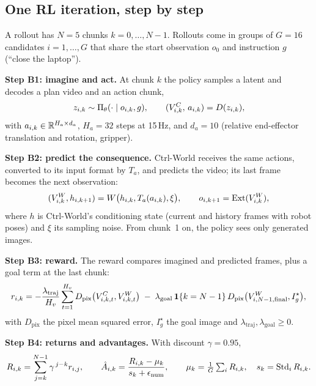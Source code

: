 \subsection{One RL iteration, step by step}
A rollout has $N=5$ chunks $k=0,\dots,N-1$. Rollouts come in groups of $G=16$ candidates $i=1,\dots,G$ that share the start observation $o_0$ and instruction $g$ (``close the laptop'').

\textbf{Step B1: imagine and act.} At chunk $k$ the policy samples a latent and decodes a plan video and an action chunk,
\begin{equation}
z_{i,k}\sim\Pi_\theta(\cdot\mid o_{i,k},g),\qquad (V^{C}_{i,k},\,a_{i,k})=D(z_{i,k}),
\end{equation}
with $a_{i,k}\in\mathbb{R}^{H_a\times d_a}$, $H_a=32$ steps at 15\,Hz, and $d_a=10$ (relative end-effector translation and rotation, gripper).

\textbf{Step B2: predict the consequence.} Ctrl-World receives the same actions, converted to its input format by $T_a$, and predicts the video; its last frame becomes the next observation:
\begin{equation}
(V^{W}_{i,k},h_{i,k+1})=W\big(h_{i,k},T_a(a_{i,k}),\xi\big),\qquad o_{i,k+1}=\mathrm{Ext}(V^{W}_{i,k}),
\end{equation}
where $h$ is Ctrl-World's conditioning state (current and history frames with robot poses) and $\xi$ its sampling noise. From chunk~1 on, the policy sees only generated images.

\textbf{Step B3: reward.} The reward compares imagined and predicted frames, plus a goal term at the last chunk:
\begin{equation}\label{method:eq:reward}
r_{i,k}=-\frac{\lambda_{\mathrm{traj}}}{H_v}\sum_{t=1}^{H_v}D_{\mathrm{pix}}\big(V^{C}_{i,k,t},V^{W}_{i,k,t}\big)\;-\;\lambda_{\mathrm{goal}}\,\mathbf 1\{k=N-1\}\,D_{\mathrm{pix}}\big(V^{W}_{i,N-1,\mathrm{final}},I^\star_g\big),
\end{equation}
with $D_{\mathrm{pix}}$ the pixel mean squared error, $I^\star_g$ the goal image and $\lambda_{\mathrm{traj}},\lambda_{\mathrm{goal}}\ge 0$.

\textbf{Step B4: returns and advantages.} With discount $\gamma=0.95$,
\begin{equation}\label{method:eq:adv}
R_{i,k}=\sum_{j=k}^{N-1}\gamma^{\,j-k}r_{i,j},\qquad
\hat A_{i,k}=\frac{R_{i,k}-\mu_k}{s_k+\epsilon_{\mathrm{num}}},\qquad
\mu_k=\tfrac1G\textstyle\sum_iR_{i,k},\quad s_k=\operatorname{Std}_i R_{i,k}.
\end{equation}

